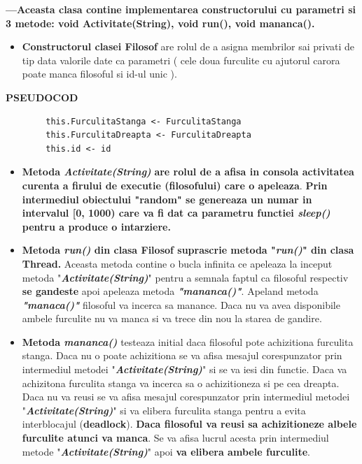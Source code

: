 \documentclass[14pt]{article}
\begin{document}
\begin{enumerate}
\textbf{---Aceasta clasa contine implementarea constructorului cu parametri si 3 metode: void Activitate(String),  void run(),  void mananca().}

\begin{itemize}
\item \textbf{Constructorul clasei Filosof} are rolul de a asigna membrilor sai privati de tip data valorile date ca parametri ( cele doua furculite cu ajutorul carora poate manca filosoful si id-ul unic ).
\end{itemize}


 \textbf{PSEUDOCOD}
 \begin{lstlisting}
        this.FurculitaStanga <- FurculitaStanga
        this.FurculitaDreapta <- FurculitaDreapta
        this.id <- id
\end{lstlisting}

\begin{itemize}
\item \textbf{Metoda\textit{ Activitate(String)} }\textbf{are rolul de a afisa in consola activitatea curenta a firului de executie (filosofului) care o apeleaza}.\textbf{ Prin intermediul obiectului "random" se genereaza un numar in intervalul [0, 1000) care va fi dat ca parametru functiei \textit{sleep() }pentru a produce o intarziere.}
\end{itemize}


\begin{itemize}
\item \textbf{Metoda\textit{ run()} din clasa Filosof suprascrie metoda "\textit{run()}" din clasa Thread.} Aceasta metoda contine o bucla infinita ce apeleaza la inceput  metoda "\textbf{\textit{Activitate(String)}}" pentru a semnala faptul ca filosoful respectiv \textbf{se gandeste} apoi apeleaza metoda \textbf{\textit{"mananca()"}}. Apeland metoda \textbf{\textit{"manaca()"}} filosoful va incerca sa manance. Daca nu va avea disponibile ambele furculite nu va manca si va trece din nou la starea de gandire. 
\end{itemize}



\begin{itemize}
\item \textbf{Metoda\textit{ mananca()} } testeaza initial daca filosoful pote achizitiona furculita stanga. Daca nu o poate achizitiona se va afisa mesajul corespunzator prin intermediul metodei  "\textbf{\textit{Activitate(String)}}" si se va iesi din functie.  Daca va achizitona furculita stanga va incerca sa o achizitioneza si pe cea dreapta.  Daca nu va reusi se va afisa mesajul corespunzator prin intermediul metodei  "\textit{\textbf{Activitate(String)}}" si va elibera furculita stanga pentru a evita interblocajul (\textbf{deadlock}). \textbf{Daca filosoful va reusi sa achizitioneze albele furculite atunci va manca}. Se va afisa  lucrul acesta prin intermediul metode  "\textbf{\textit{Activitate(String)}}" apoi\textbf{ va elibera ambele furculite}.
\end{itemize}



\end{enumerate}
\end{document}
